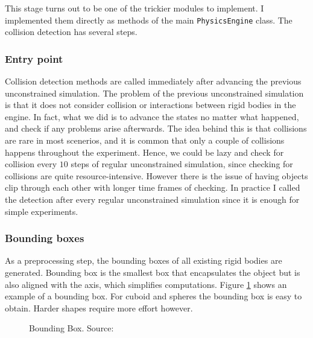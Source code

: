 \documentclass[12pt,a4paper,twoside,openright]{report}
\newcommand{\code}{\texttt}
\begin{document}
This stage turns out to be one of the trickier modules to implement. I implemented them directly as methods of the main \code{PhysicsEngine} class. The collision detection has several steps.

\subsubsection{Entry point} 
Collision detection methods are called immediately after advancing the previous unconstrained simulation. The problem of the previous unconstrained simulation is that it does not consider collision or interactions between rigid bodies in the engine. In fact, what we did is to advance the states no matter what happened, and check if any problems arise afterwards. The idea behind this is that collisions are rare in most scenerios, and it is common that only a couple of collisions happens throughout the experiment. Hence, we could be lazy and check for collision every $10$ steps of regular unconstrained simulation, since checking for collisions are quite resource-intensive. However there is the issue of having objects clip through each other with longer time frames of checking. In practice I called the detection after every regular unconstrained simulation since it is enough for simple experiments.

\subsubsection{Bounding boxes}
As a preprocessing step, the bounding boxes of all existing rigid bodies are generated. Bounding box is the smallest box that encapsulates the object but is also aligned with the axis, which simplifies computations. Figure \ref{bboxfig} shows an example of a bounding box. For cuboid and spheres the bounding box is easy to obtain. Harder shapes require more effort however\cite{o1985finding}.

\begin{figure}
\begin{center}
  \end{center}
    \caption{Bounding Box. Source: \cite{bbox}}
    \label{bboxfig}
\end{figure}
\end{document}
